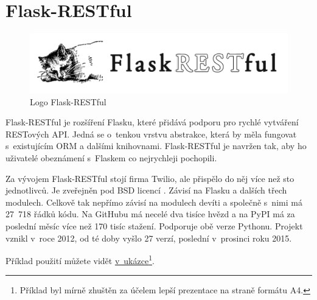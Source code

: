 \section{Flask-RESTful}\label{flask-restful}

\begin{figure}
\centering
\includegraphics{images/flask-restful}
\caption{Logo Flask-RESTful \autocite{flaskresfulpic}\label{pic:flaskresful}}
\end{figure}

Flask-RESTful je rozšíření Flasku, které přidává podporu pro rychlé vytváření RESTových API. Jedná se o~tenkou vrstvu abstrakce, která by měla fungovat s~existujícím ORM a dalšími knihovnami. Flask-RESTful je navržen tak, aby ho uživatelé obeznámení s~Flaskem co nejrychleji pochopili. \autocite{flaskresful}

Za vývojem Flask-RESTful stojí firma Twilio, ale přispělo do něj více než sto jednotlivců. Je zveřejněn pod BSD licencí \autocite{BSD3}. Závisí na Flasku a dalších třech modulech. Celkově tak nepřímo závisí na modulech devíti a společně s~nimi má 27~718 řádků kódu. Na GitHubu má necelé dva tisíce hvězd a na PyPI má za poslední měsíc více než 170 tisíc stažení. Podporuje obě verze Pythonu. Projekt vznikl v~roce 2012, od té doby vyšlo 27 verzí, poslední v~prosinci roku 2015.

Příklad použití můžete vidět \protect\hyperlink{code:flaskresful}{v~ukázce}\footnote{Příklad byl mírně zhuštěn za účelem lepší prezentace na straně formátu A4.}.

